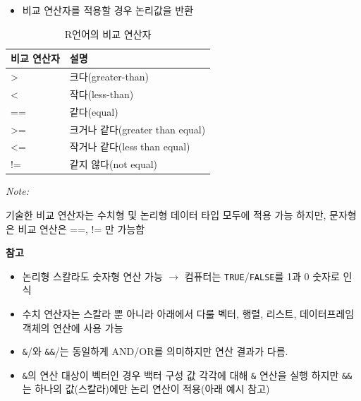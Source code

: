 \documentclass[
  11pt,
]{krantz}
\providecommand{\tightlist}{%
  \setlength{\itemsep}{0pt}\setlength{\parskip}{0pt}}
\let\BeginKnitrBlock\begin \let\EndKnitrBlock\end
\begin{document}
\normalsize

\begin{itemize}
\tightlist
\item
  비교 연산자를 적용할 경우 논리값을 반환
\end{itemize}

\footnotesize

\begin{table}[H]

\caption{\label{tab:comp-op-tab}R언어의 비교 연산자}
\centering
\fontsize{10}{12}\selectfont
\begin{threeparttable}
\begin{tabular}[t]{>{\raggedright\arraybackslash}p{3cm}>{\raggedright\arraybackslash}p{7cm}}
\toprule
비교 연산자 & 설명\\
\midrule
\rowcolor{gray!6}  > & 크다(greater-than)\\
< & 작다(less-than)\\
\rowcolor{gray!6}  == & 같다(equal)\\
>= & 크거나 같다(greater than equal)\\
\rowcolor{gray!6}  <= & 작거나 같다(less than equal)\\
\addlinespace
!= & 같지 않다(not equal)\\
\bottomrule
\end{tabular}
\begin{tablenotes}
\item \textit{Note: } 
\item 기술한 비교 연산자는 수치형 및 논리형 데이터 타입 모두에 적용 가능 하지만, 문자형은 비교 연산은 ==, != 만 가능함
\end{tablenotes}
\end{threeparttable}
\end{table}

\normalsize

\footnotesize

\BeginKnitrBlock{rmdnote}
\textbf{참고}

\begin{itemize}
\tightlist
\item
  논리형 스칼라도 숫자형 연산 가능 \(\rightarrow\) 컴퓨터는 \texttt{TRUE}/\texttt{FALSE}를 1과 0 숫자로 인식
\item
  수치 연산자는 스칼라 뿐 아니라 아래에서 다룰 벡터, 행렬, 리스트, 데이터프레임 객체의 연산에 사용 가능
\item
  \texttt{\&}/\texttt{\textbar{}}와 \texttt{\&\&}/\texttt{\textbar{}\textbar{}}는 동일하게 AND/OR를 의미하지만 연산 결과가 다름.
\item
  \texttt{\&}의 연산 대상이 벡터인 경우 백터 구성 값 각각에 대해 \texttt{\&} 연산을 실행 하지만 \texttt{\&\&}는 하나의 값(스칼라)에만 논리 연산이 적용(아래 예시 참고)
\end{itemize}
\EndKnitrBlock{rmdnote}
\end{document}
